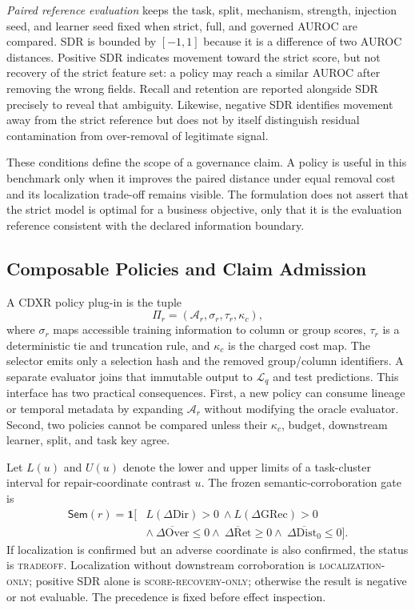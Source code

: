 \documentclass[sigconf,review]{acmart}
\begin{document}
\textit{Paired reference evaluation} keeps the task, split, mechanism,
strength, injection seed, and learner seed fixed when strict, full, and
governed AUROC are compared. SDR is bounded by $[-1,1]$ because it is a
difference of two AUROC distances. Positive SDR indicates movement toward the
strict score, but not recovery of the strict feature set: a policy may reach a
similar AUROC after removing the wrong fields. Recall and retention are
reported alongside SDR precisely to reveal that ambiguity. Likewise, negative
SDR identifies movement away from the strict reference but does not by itself
distinguish residual contamination from over-removal of legitimate signal.

These conditions define the scope of a governance claim. A policy is useful in
this benchmark only when it improves the paired distance under equal removal
cost and its localization trade-off remains visible. The formulation does not
assert that the strict model is optimal for a business objective, only that it
is the evaluation reference consistent with the declared information
boundary.

\subsection{Composable Policies and Claim Admission}

A CDXR policy plug-in is the tuple
\begin{equation}
 \Pi_r=(\mathcal{A}_r,\sigma_r,\tau_r,\kappa_c),
 \label{eq:policy-plugin}
\end{equation}
where $\sigma_r$ maps accessible training information to column or group
scores, $\tau_r$ is a deterministic tie and truncation rule, and $\kappa_c$ is
the charged cost map. The selector emits only a selection hash and the removed
group/column identifiers. A separate evaluator joins that immutable output to
$\mathcal{L}_q$ and test predictions. This interface has two practical
consequences. First, a new policy can consume lineage or temporal metadata by
expanding $\mathcal{A}_r$ without modifying the oracle evaluator. Second, two
policies cannot be compared unless their $\kappa_c$, budget, downstream
learner, split, and task key agree.

Let $L(u)$ and $U(u)$ denote the lower and upper limits of a task-cluster
interval for repair-coordinate contrast $u$. The frozen semantic-corroboration
gate is
\begin{equation}
\begin{split}
 \mathsf{Sem}(r)=\mathbf{1}[&L(\Delta\mathrm{Dir})>0\ \land
 L(\Delta\mathrm{GRec})>0\\
 &\land\ \overline{\Delta\mathrm{Over}}\leq0
 \land\ \overline{\Delta\mathrm{Ret}}\geq0
 \land\ \overline{\Delta\mathrm{Dist}_0}\leq0].
\end{split}
 \label{eq:semantic-gate}
\end{equation}
If localization is confirmed but an adverse coordinate is also confirmed, the
status is \textsc{tradeoff}. Localization without downstream corroboration is
\textsc{localization-only}; positive SDR alone is
\textsc{score-recovery-only}; otherwise the result is negative or not
evaluable. The precedence is fixed before effect inspection.
\end{document}
